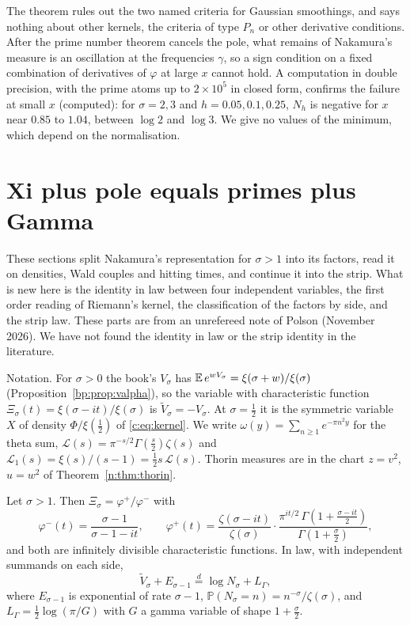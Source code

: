 The theorem rules out the two named criteria for Gaussian smoothings, and says nothing about other kernels, the criteria of type $P_n$ or other derivative conditions. After the prime number theorem cancels the pole, what remains of Nakamura's measure is an oscillation at the frequencies $\gamma$, so a sign condition on a fixed combination of derivatives of $\varphi$ at large $x$ cannot hold. A computation in double precision, with the prime atoms up to $2\times10^5$ in closed form, confirms the failure at small $x$ (computed): for $\sigma=2,3$ and $h=0.05,0.1,0.25$, $N_h$ is negative for $x$ near $0.85$ to $1.04$, between $\log2$ and $\log3$. We give no values of the minimum, which depend on the normalisation.

\section{Xi plus pole equals primes plus Gamma}\label{nf:sec:four}

These sections split Nakamura's representation for $\sigma>1$ into its factors, read it on densities, Wald couples and hitting times, and continue it into the strip. What is new here is the identity in law between four independent variables, the first order reading of Riemann's kernel, the classification of the factors by side, and the strip law. These parts are from an unrefereed note of Polson (November 2026). We have not found the identity in law or the strip identity in the literature.

Notation. For $\sigma>0$ the book's $V_\sigma$ has $\mathbb{E}\,e^{wV_\sigma}=\xi(\sigma+w)/\xi(\sigma)$ (Proposition~\ref{bp:prop:valpha}), so the variable with characteristic function $\Xi_\sigma(t)=\xi(\sigma-it)/\xi(\sigma)$ is $\tilde V_\sigma=-V_\sigma$. At $\sigma=\frac12$ it is the symmetric variable $X$ of density $\Phi/\xi(\frac12)$ of \eqref{c:eq:kernel}. We write $\omega(y)=\sum_{n\ge1}e^{-\pi n^2y}$ for the theta sum, $\mathcal L(s)=\pi^{-s/2}\Gamma(\frac s2)\zeta(s)$ and $\mathcal L_1(s)=\xi(s)/(s-1)=\frac12s\,\mathcal L(s)$. Thorin measures are in the chart $z=v^2$, $u=w^2$ of Theorem~\ref{n:thm:thorin}.

\begin{theorem}[proved]\label{nf:thm:four}
Let $\sigma>1$. Then $\Xi_\sigma=\varphi^+/\varphi^-$ with
\[
\varphi^-(t)=\frac{\sigma-1}{\sigma-1-it},\qquad
\varphi^+(t)=\frac{\zeta(\sigma-it)}{\zeta(\sigma)}\cdot\frac{\pi^{it/2}\,\Gamma(1+\frac{\sigma-it}2)}{\Gamma(1+\frac\sigma2)},
\]
and both are infinitely divisible characteristic functions. In law, with independent summands on each side,
\[
\tilde V_\sigma+E_{\sigma-1}\overset d=\log N_\sigma+L_\Gamma,
\]
where $E_{\sigma-1}$ is exponential of rate $\sigma-1$, $\mathbb P(N_\sigma=n)=n^{-\sigma}/\zeta(\sigma)$, and $L_\Gamma=\frac12\log(\pi/G)$ with $G$ a gamma variable of shape $1+\frac\sigma2$.
\end{theorem}

